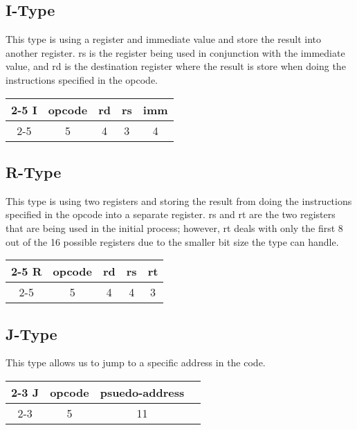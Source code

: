 \documentclass[12pt, a4paper]{report}
\begin{document}
	\subsection{I-Type}
	This type is using a register and immediate value and store the result into another register. rs is the register being used in 
	conjunction with the immediate value, and rd is the destination register where the result is store when doing the instructions 
	specified in the opcode.
	\begin{center}
		{\renewcommand{\arraystretch}{1.5}
			\begin{tabular}[b]{c @{ } c | c | c | c|}
				\cline{2-5}
				I & \vline \hspace{1.5pt} opcode & rd & rs & imm \\
				\cline{2-5}
				\multicolumn{1}{}{} & \multicolumn{1}{c}{5} & \multicolumn{1}{c}{4}
				& \multicolumn{1}{c}{3} & \multicolumn{1}{c}{4}
			\end{tabular}}
	\end{center}

	\subsection{R-Type}
	This type is using two registers and storing the result from doing the instructions specified in the opcode into a separate register. 
	rs and rt are the two registers that are being used in the initial process; however, 
	rt deals with only the first 8 out of the 16 possible registers due to the smaller bit size the type can handle. 
	\begin{center}
		{\renewcommand{\arraystretch}{1.5}
			\begin{tabular}[b]{c @{ } c | c | c | c|}
				\cline{2-5}
				R & \vline \hspace{1.5pt} opcode & rd & rs & rt \\
				\cline{2-5}
				\multicolumn{1}{}{} & \multicolumn{1}{c}{5} & \multicolumn{1}{c}{4}
				& \multicolumn{1}{c}{4} & \multicolumn{1}{c}{3}
			\end{tabular}}
	\end{center}

	\subsection{J-Type}
	This type allows us to jump to a specific address in the code.
	\begin{center}
		{\renewcommand{\arraystretch}{1.5}
			\begin{tabular}[b]{c @{ } c | c | c |}
				\cline{2-3}
				J & \vline \hspace{1.5pt} opcode & psuedo-address \\
				\cline{2-3}
				\multicolumn{1}{}{} & \multicolumn{1}{c}{5} & \multicolumn{1}{c}{11}
			\end{tabular}}
	\end{center}
\end{document}
